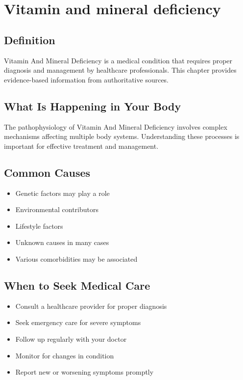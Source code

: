 
\chapter{Vitamin and mineral deficiency}

\section*{Definition}
Vitamin And Mineral Deficiency is a medical condition that requires proper diagnosis and management by healthcare professionals. This chapter provides evidence-based information from authoritative sources.

\section*{What Is Happening in Your Body}
The pathophysiology of Vitamin And Mineral Deficiency involves complex mechanisms affecting multiple body systems. Understanding these processes is important for effective treatment and management.

\section*{Common Causes}
\begin{itemize}
  \item Genetic factors may play a role
  \item Environmental contributors
  \item Lifestyle factors
  \item Unknown causes in many cases
  \item Various comorbidities may be associated
\end{itemize}

\section*{When to Seek Medical Care}
\begin{itemize}
  \item Consult a healthcare provider for proper diagnosis
  \item Seek emergency care for severe symptoms
  \item Follow up regularly with your doctor
  \item Monitor for changes in condition
  \item Report new or worsening symptoms promptly
\end{itemize}


